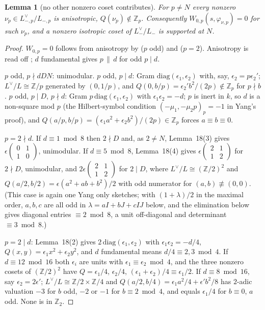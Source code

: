 \documentclass[11pt,reqno]{amsart}
\theoremstyle{plain}
\newtheorem{lemma}[theorem]{Lemma}
\theoremstyle{definition}
\newcommand{\Z}{\mathbb{Z}}
\newcommand{\Lm}{L_{-}}
\begin{document}
\begin{lemma}[no other nonzero coset contributes]\label{lem:Wp}
For $p\neq N$ every nonzero $\nu_p\in L_{-,p}^\vee/L_{-,p}$ is anisotropic, $Q(\nu_p)\notin\Z_p$.
Consequently $W_{0,p}(s,\varphi_{\nu,p})=0$ for such $\nu_p$, and a nonzero isotropic coset of
$\Lm^\vee/\Lm$ is supported at $N$.
\end{lemma}
\begin{proof}
$W_{0,p}=0$ follows from anisotropy by \cite[Thm.~4.3(i)]{KY} ($p$ odd) and \cite[Thm.~4.4(i)]{KY}
($p=2$). Anisotropy is read off \cite[Lemma~18]{Yang}; $d$ fundamental gives $p\,\|\,d$ for odd
$p\mid d$.

$p$ odd, $p\nmid dDN$: unimodular. $p$ odd, $p\mid d$: Gram $\mathrm{diag}(\epsilon_1,\epsilon_2)$
with, say, $\epsilon_2=p\epsilon_2'$; $L^\vee/L\cong\Z/p$ generated by $(0,1/p)$, and
$Q(0,b/p)=\epsilon_2'b^2/(2p)\notin\Z_p$ for $p\nmid b$. $p$ odd, $p\mid D$, $p\nmid d$: Gram
$p\,\mathrm{diag}(\epsilon_1,\epsilon_2)$ with $\epsilon_1\epsilon_2=-d$; $p$ is inert in $k$, so
$d$ is a non-square mod $p$ (the Hilbert-symbol condition $(-\mu_1,-\mu_2p)_p=-1$ in Yang's
proof), and $Q(a/p,b/p)=(\epsilon_1a^2+\epsilon_2b^2)/(2p)\in\Z_p$ forces $a\equiv b\equiv0$.

$p=2\nmid d$. If $d\equiv1\bmod8$ then $2\nmid D$ and, as $2\neq N$, Lemma~18(3) gives
$\epsilon\begin{pmatrix}0&1\\1&0\end{pmatrix}$, unimodular. If $d\equiv5\bmod8$, Lemma~18(4) gives
$\epsilon\begin{pmatrix}2&1\\1&2\end{pmatrix}$ for $2\nmid D$, unimodular, and $2\epsilon
\begin{pmatrix}2&1\\1&2\end{pmatrix}$ for $2\mid D$, where $L^\vee/L\cong(\Z/2)^2$ and
$Q(a/2,b/2)=\epsilon(a^2+ab+b^2)/2$ with odd numerator for $(a,b)\not\equiv(0,0)$. (This case is
again one Yang only sketches; with $(1+\lambda)/2$ in the maximal order, $a,b,c$ are all odd in
$\lambda=aI+bJ+cIJ$ below, and the elimination below gives diagonal entries $\equiv2\bmod8$, a
unit off-diagonal and determinant $\equiv3\bmod8$.)

$p=2\mid d$: Lemma~18(2) gives $2\,\mathrm{diag}(\epsilon_1,\epsilon_2)$ with
$\epsilon_1\epsilon_2=-d/4$, $Q(x,y)=\epsilon_1x^2+\epsilon_2y^2$, and $d$ fundamental means
$d/4\equiv2,3\bmod4$. If $d\equiv12\bmod16$ both $\epsilon_i$ are units with $\epsilon_1\equiv
\epsilon_2\bmod4$, and the three nonzero cosets of $(\Z/2)^2$ have $Q=\epsilon_1/4$,
$\epsilon_2/4$, $(\epsilon_1+\epsilon_2)/4\equiv\epsilon_1/2$. If $d\equiv8\bmod16$, say
$\epsilon_2=2\epsilon'$; $L^\vee/L\cong\Z/2\times\Z/4$ and $Q(a/2,b/4)=\epsilon_1a^2/4+
\epsilon'b^2/8$ has $2$-adic valuation $-3$ for $b$ odd, $-2$ or $-1$ for $b\equiv2\bmod4$, and
equals $\epsilon_1/4$ for $b\equiv0$, $a$ odd. None is in $\Z_2$.


\end{proof}
\end{document}
